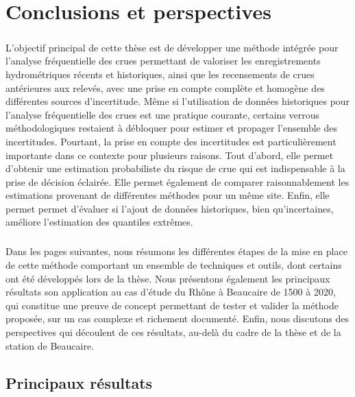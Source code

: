 \chapter{Conclusions et perspectives}
\label{chap:conclu}
\newpage

\paragraph{} L'objectif principal de cette thèse est de développer une méthode intégrée pour l'analyse fréquentielle des crues permettant de valoriser les enregistrements hydrométriques récents et historiques, ainsi que les recensements de crues antérieures aux relevés, avec une prise en compte complète et homogène des différentes sources d'incertitude. Même si l'utilisation de données historiques pour l'analyse fréquentielle des crues est une pratique courante, certains verrous méthodologiques restaient à débloquer pour estimer et propager l'ensemble des incertitudes. Pourtant, la prise en compte des incertitudes est particulièrement importante dans ce contexte pour plusieurs raisons. Tout d'abord, elle permet d'obtenir une estimation probabiliste du risque de crue qui est indispensable à la prise de décision éclairée. Elle permet également de comparer raisonnablement les estimations provenant de différentes méthodes pour un même site. Enfin, elle permet permet d'évaluer si l'ajout de données historiques, bien qu'incertaines, améliore l'estimation des quantiles extrêmes.

\paragraph{} Dans les pages suivantes, nous résumons les différentes étapes de la mise en place de cette méthode comportant un ensemble de techniques et outils, dont certains ont été développés lors de la thèse. Nous présentons également les principaux résultats son application au cas d'étude du Rhône à Beaucaire de 1500 à 2020, qui constitue une preuve de concept permettant de tester et valider la méthode proposée, sur un cas complexe et richement documenté. Enfin, nous discutons des perspectives qui découlent de ces résultats, au-delà du cadre de la thèse et de la station de Beaucaire. 
	
	
	\section{Principaux résultats}
	
